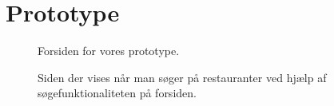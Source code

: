 \documentclass[a4paper, 12pt]{article}
\begin{document}
\section{Prototype}
\label{appx:prototype}

\begin{figure}[hp]
  \centering
  \caption{Forsiden for vores prototype.}
\end{figure}

\begin{figure}[hp]
  \centering
  \caption{Siden der vises når man søger på restauranter ved hjælp af
    søgefunktionaliteten på forsiden.}
\end{figure}
\end{document}
